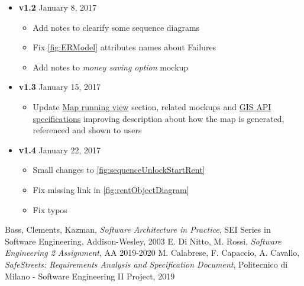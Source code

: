 \begin{appendices}
\begin{itemize}
\begin{itemize}
		\end{itemize}
		\item \textbf{v1.2} January 8, 2017
		\begin{itemize}
			\item Add notes to clearify some sequence diagrams
			\item Fix \autoref{fig:ERModel} attributes names about Failures
			\item Add notes to \emph{money saving option} mockup
		\end{itemize}
		\item  \textbf{v1.3} January 15, 2017
		\begin{itemize}
			\item Update \hyperref[sec:mapRunView]{Map running view} section, related mockups and \hyperref[sec:gis]{GIS API specifications} improving description about how the map is generated, referenced  and shown to users
		\end{itemize}
		\item  \textbf{v1.4} January 22, 2017
		\begin{itemize}
			\item Small changes to \autoref{fig:sequenceUnlockStartRent}
			\item Fix missing link in \autoref{fig:rentObjectDiagram}
			\item Fix typos 
		\end{itemize}
	\end{itemize}
	
\end{appendices}


\begin{thebibliography}{9}

Bass, Clements, Kazman, \emph{Software Architecture in Practice}, SEI Series in Software Engineering, Addison-­Wesley, 2003
 E. Di Nitto, M. Rossi, \emph{Software Engineering 2 Assignment}, AA 2019-2020
 M. Calabrese, F. Capaccio, A. Cavallo, \emph{SafeStreets: Requirements Analysis and Specification Document}, Politecnico di Milano - Software Engineering II Project, 2019

\end{thebibliography}